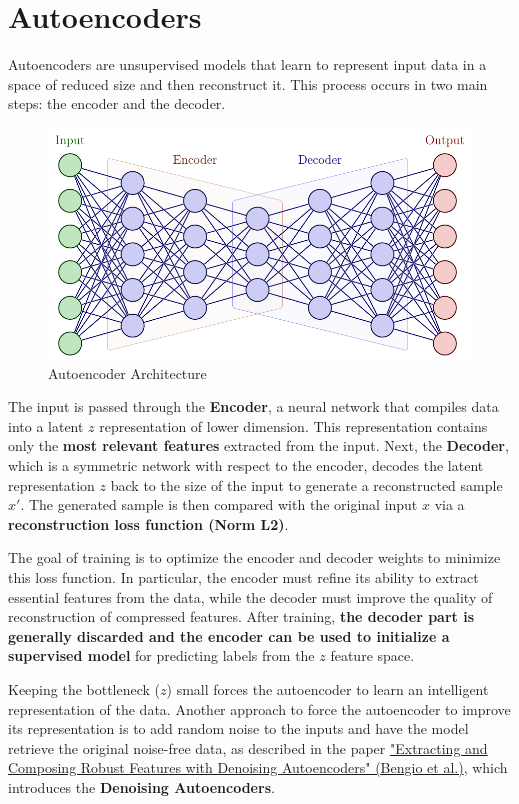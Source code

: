 \section{Autoencoders}

Autoencoders are unsupervised models that learn to represent input data in a space of reduced size and then reconstruct it. This process occurs in two main steps: the encoder and the decoder.

\begin{figure}[!htbp]
    \centering
    \includegraphics[width=\linewidth]{tikz/chapter9 - Autoencoder.pdf}
    \caption{Autoencoder Architecture}
\end{figure}

The input is passed through the \textbf{Encoder}, a neural network that compiles data into a latent $z$ representation of lower dimension. This representation contains only the \textbf{most relevant features} extracted from the input. Next, the \textbf{Decoder}, which is a symmetric network with respect to the encoder, decodes the latent representation $z$ back to the size of the input to generate a reconstructed sample $x'$. The generated sample is then compared with the original input $x$ via a \textbf{reconstruction loss function (Norm L2)}.

The goal of training is to optimize the encoder and decoder weights to minimize this loss function. In particular, the encoder must refine its ability to extract essential features from the data, while the decoder must improve the quality of reconstruction of compressed features. After training, \textbf{the decoder part is generally discarded and the encoder can be used to initialize a supervised model} for predicting labels from the $z$ feature space.

Keeping the bottleneck ($z$) small forces the autoencoder to learn an intelligent representation of the data. Another approach to force the autoencoder to improve its representation is to add random noise to the inputs and have the model retrieve the original noise-free data, as described in the paper \href{https://www.cs.toronto.edu/~larocheh/publications/icml-2008-denoising-autoencoders.pdf}{"Extracting and Composing Robust Features with Denoising Autoencoders" (Bengio et al.)}, which introduces the \textbf{Denoising Autoencoders}.

